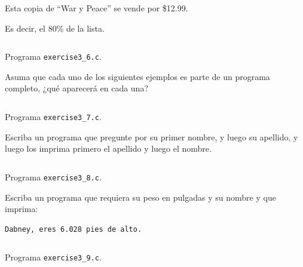 \documentclass[spanish,addpoints,answers,a4paper]{exam}
\begin{document}
\begin{questions}
\begin{flushleft}
Esta copia de ``War y Peace'' se vende por \$12.99.

Es decir, el 80\% de la lista.
\end{flushleft}

\begin{solution}
\begin{listing}[H]
\footnotesize
\inputminted{c}{exercise3_6.c}
\caption{Programa \texttt{exercise3\_6.c}.}
\label{lst:3.6}
\end{listing}
\end{solution}

\question Asuma que cada uno de los siguientes ejemplos es parte de un programa completo, ¿qué aparecerá en cada una?

\begin{solution}
\begin{listing}[H]
\footnotesize
\inputminted{c}{exercise3_7.c}
\caption{Programa \texttt{exercise3\_7.c}.}
\label{lst:3.7}
\end{listing}
\end{solution}

\question Escriba un programa que pregunte por su primer nombre, y luego su apellido, y luego los imprima primero el apellido y luego el nombre.

\begin{solution}
\begin{listing}[H]
\footnotesize
\inputminted{c}{exercise3_8.c}
\caption{Programa \texttt{exercise3\_8.c}.}
\label{lst:3.8}
\end{listing}
\end{solution}

\question Escriba un programa que requiera su peso en pulgadas y su nombre y que imprima:
\begin{verbatim}
Dabney, eres 6.028 pies de alto.
\end{verbatim}

\begin{solution}
\begin{listing}[H]
\footnotesize
\inputminted{c}{exercise3_9.c}
\caption{Programa \texttt{exercise3\_9.c}.}
\label{lst:3.9}
\end{listing}
\end{solution}


\end{questions}
\end{document}
